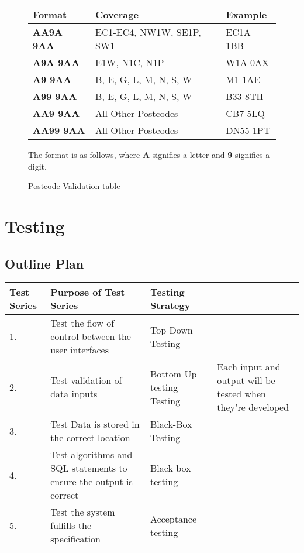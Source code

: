 \begin{python}
\pagebreak


\begin{figure}[H]
\caption{Postcode Validation table} \label{fig: Postcode Validation table}
\begin{tabular}{|p{2cm}|p{3cm}|p{2cm}|}
        \hline
        \textbf{Format} & \textbf{Coverage} & \textbf{Example} \\ \hline
        \textbf{AA9A 9AA} & EC1-EC4, NW1W, SE1P, SW1 & EC1A 1BB \\ \hline
        \textbf{A9A 9AA} & E1W, N1C, N1P & W1A 0AX \\ \hline
        \textbf{A9 9AA} & B, E, G, L, M, N, S, W & M1 1AE \\ \hline
         \textbf{A99 9AA} & B, E, G, L, M, N, S, W & B33 8TH \\ \hline
         \textbf{AA9 9AA} & All Other Postcodes & CB7 5LQ \\ \hline
         \textbf{AA99 9AA} & All Other Postcodes & DN55 1PT \\ \hline
  \end{tabular}
\par
\par
  The format is as follows, where \textbf{A} signifies a letter and \textbf{9} signifies a digit.
\end{figure}



\section{Testing}
\begin{landscape}

\subsection{Outline Plan}
\begin{center}
    \begin{tabular}{|p{2cm}|p{5cm}|p{5cm}|p{4cm}|}
        \hline
        \textbf{Test Series} & \textbf{Purpose of Test Series} & \textbf{Testing Strategy} & \\ \hline
	1. & Test the flow of control between the user interfaces & Top Down Testing &  \\ \hline
	2. & Test validation of data inputs & Bottom Up testing Testing &  Each input and output will be tested when they're developed\\ \hline
	3. & Test Data is stored in the correct location & Black-Box Testing & \\ \hline
	4. & Test algorithms and SQL statements to ensure the output is correct & Black box testing &\\ \hline
	5. & Test the system fulfills the specification & Acceptance testing & \\ \hline


\end{tabular}
\end{center}
\end{landscape}
\end{python}
